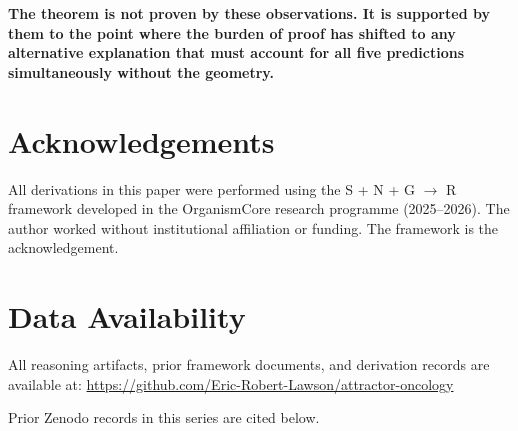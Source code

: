 \documentclass[12pt, a4paper]{article}
\begin{document}
\bigskip

\noindent\textbf{The theorem is not proven by these
observations. It is supported by them to the point where
the burden of proof has shifted to any alternative
explanation that must account for all five predictions
simultaneously without the geometry.}

\section*{Acknowledgements}

All derivations in this paper were performed using the
S + N + G $\rightarrow$ R framework developed in the
OrganismCore research programme (2025--2026). The author
worked without institutional affiliation or funding.
The framework is the acknowledgement.

\section*{Data Availability}

All reasoning artifacts, prior framework documents, and
derivation records are available at:
\url{https://github.com/Eric-Robert-Lawson/attractor-oncology}

Prior Zenodo records in this series are cited below.
\end{document}
